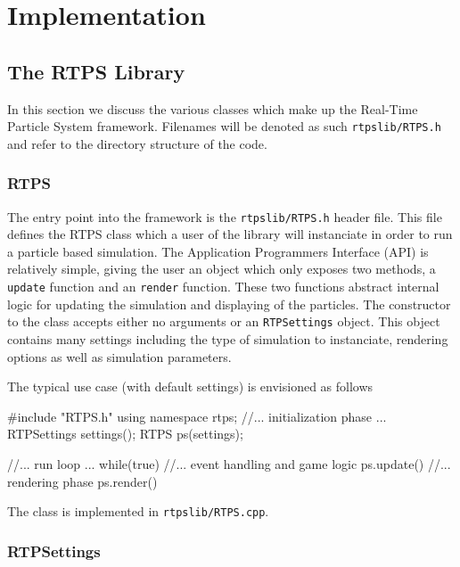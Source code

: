 \chapter{Implementation}

\section{The RTPS Library}

In this section we discuss the various classes which make up the Real-Time
Particle System framework. Filenames will be denoted as such \verb|rtpslib/RTPS.h|
and refer to the directory structure of the code. 

\subsection{RTPS}

The entry point into the framework is the \verb|rtpslib/RTPS.h| header file. This file defines
the RTPS class which a user of the library will instanciate in order to run a
particle based simulation. The Application Programmers Interface (API) is
relatively simple, giving the user an object which only exposes two methods, a
\verb|update| function and an \verb|render| function. These two functions abstract
internal logic for updating the simulation and displaying of the particles. The
constructor to the class accepts either no arguments or an \verb|RTPSettings| object.
This object contains many settings including the type of simulation to
instanciate, rendering options as well as simulation parameters. 

The typical use case (with default settings) is envisioned as follows
\begin{cppcode}{0}
#include "RTPS.h"
using namespace rtps;
//... initialization phase ...
RTPSettings settings();
RTPS ps(settings);

//... run loop ...
while(true)
{
    //... event handling and game logic
    ps.update()
    //... rendering phase
    ps.render()
}

\end{cppcode}

The class is implemented in \verb|rtpslib/RTPS.cpp|.

\subsection{RTPSettings}

